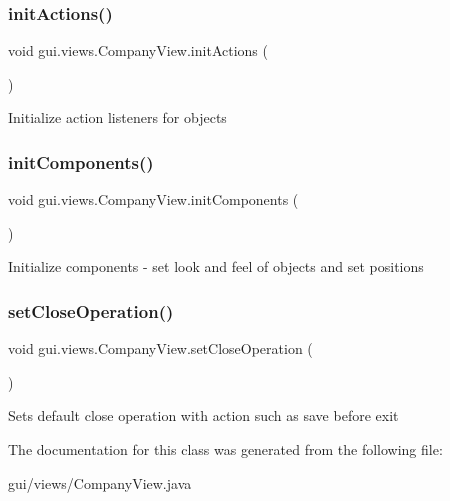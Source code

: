 \subsubsection{\texorpdfstring{init\+Actions()}{initActions()}}
{\footnotesize\ttfamily void gui.\+views.\+Company\+View.\+init\+Actions (\begin{DoxyParamCaption}{ }\end{DoxyParamCaption})\hspace{0.3cm}{\ttfamily [inline]}}

Initialize action listeners for objects \mbox{\label{classgui_1_1views_1_1_company_view_a9a68d5e202ac887657159416dadb6887}} 
\subsubsection{\texorpdfstring{init\+Components()}{initComponents()}}
{\footnotesize\ttfamily void gui.\+views.\+Company\+View.\+init\+Components (\begin{DoxyParamCaption}{ }\end{DoxyParamCaption})\hspace{0.3cm}{\ttfamily [inline]}}

Initialize components -\/ set look and feel of objects and set positions \mbox{\label{classgui_1_1views_1_1_company_view_abc80fd483dd89c441dbbe6a93ec7b213}} 
\subsubsection{\texorpdfstring{set\+Close\+Operation()}{setCloseOperation()}}
{\footnotesize\ttfamily void gui.\+views.\+Company\+View.\+set\+Close\+Operation (\begin{DoxyParamCaption}{ }\end{DoxyParamCaption})\hspace{0.3cm}{\ttfamily [inline]}}

Sets default close operation with action such as save before exit 

The documentation for this class was generated from the following file\+:\begin{DoxyCompactItemize}
\item 
gui/views/Company\+View.\+java\end{DoxyCompactItemize}
